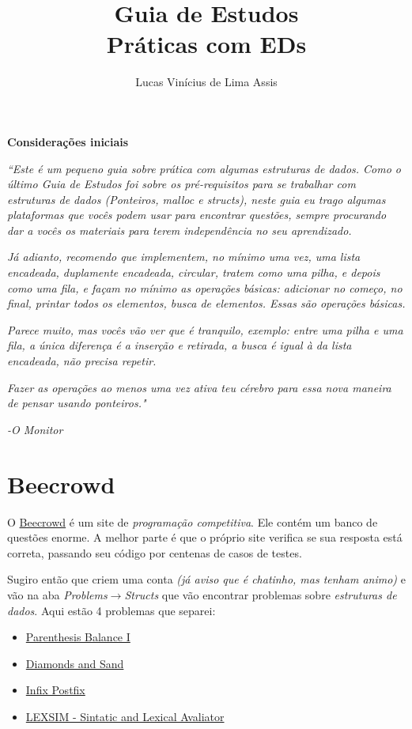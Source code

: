 \documentclass[a4paper]{article}
\author{Lucas Vinícius de Lima Assis}
\title{Guia de Estudos \\ Práticas com EDs}
\begin{document}
    \maketitle
    \begin{center}
        \textbf{Considerações iniciais}
    \end{center}

    \textit{``Este é um pequeno guia sobre prática com algumas estruturas de dados.
        Como o último Guia de Estudos foi sobre os \emph{pré-requisitos} para se
    trabalhar com estruturas de dados (Ponteiros, malloc e structs), neste guia
    eu trago algumas plataformas que vocês podem usar para encontrar questões,
    sempre procurando dar a vocês os materiais para terem independência no seu
    aprendizado.}   

    \textit{Já adianto, recomendo que implementem, no mínimo uma vez, uma lista
    encadeada, duplamente encadeada, circular, tratem como uma pilha, e depois
    como uma fila, e façam no mínimo as operações básicas:
    adicionar no começo, no final, printar todos os elementos, busca de
    elementos. Essas são operações básicas.} 

    \textit{Parece muito, mas vocês vão ver que é tranquilo, exemplo: entre uma
    pilha e uma fila, a única diferença é a inserção e retirada, a busca é igual
    à da lista encadeada, não precisa repetir.}

    \textit{Fazer as operações ao menos uma vez ativa teu cérebro para essa nova maneira
    de pensar usando ponteiros."}
    \begin{flushright}
        \textit{-O Monitor}
    \end{flushright}

    \section*{Beecrowd}
    O \href{https://www.beecrowd.com.br/}{Beecrowd} é um site de
    \emph{programação competitiva}. Ele contém um banco de questões enorme. A
    melhor parte é que o próprio site verifica se sua resposta está correta,
    passando seu código por centenas de casos de testes.
    
    Sugiro então que criem uma conta \textit{(já aviso que é chatinho, mas tenham
    animo)} e vão na aba \emph{Problems}$\to$\emph{Structs} que vão encontrar
    problemas sobre \emph{estruturas de dados}. Aqui estão 4 problemas que
    separei:

    \begin{itemize}
        \item \href{https://www.beecrowd.com.br/judge/en/problems/view/1068}{Parenthesis Balance I}
        \item \href{https://www.beecrowd.com.br/judge/en/problems/view/1069}{Diamonds
            and Sand}
        \item
            \href{https://www.beecrowd.com.br/judge/en/problems/view/1077}{Infix
            Postfix}
        \item
            \href{https://www.beecrowd.com.br/judge/en/problems/view/1083}{LEXSIM
            - Sintatic and Lexical Avaliator}
    \end{itemize}
\end{document}
